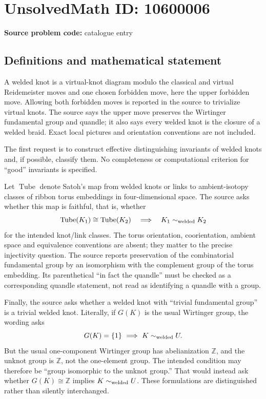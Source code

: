 \documentclass[11pt]{article}
\newcommand{\Z}{\mathbb{Z}}
\begin{document}
\section*{UnsolvedMath ID: 10600006}
\textbf{Source problem code:} catalogue entry
\subsection{Definitions and mathematical statement}
A welded knot is a virtual-knot diagram modulo the classical and virtual Reidemeister moves and one chosen forbidden move, here the upper forbidden move. Allowing both forbidden moves is reported in the source to trivialize virtual knots. The source says the upper move preserves the Wirtinger fundamental group and quandle; it also says every welded knot is the closure of a welded braid. Exact local pictures and orientation conventions are not included.

The first request is to construct effective distinguishing invariants of welded knots and, if possible, classify them. No completeness or computational criterion for ``good'' invariants is specified.

Let \(\operatorname{Tube}\) denote Satoh's map from welded knots or links to ambient-isotopy classes of ribbon torus embeddings in four-dimensional space. The source asks whether this map is faithful, that is, whether
\[
 \operatorname{Tube}(K_1)\cong\operatorname{Tube}(K_2)
 \quad\Longrightarrow\quad K_1\sim_{\rm welded}K_2
\]
for the intended knot/link classes. The torus orientation, coorientation, ambient space and equivalence conventions are absent; they matter to the precise injectivity question. The source reports preservation of the combinatorial fundamental group by an isomorphism with the complement group of the torus embedding. Its parenthetical ``in fact the quandle'' must be checked as a corresponding quandle statement, not read as identifying a quandle with a group.

Finally, the source asks whether a welded knot with ``trivial fundamental group'' is a trivial welded knot. Literally, if \(G(K)\) is the usual Wirtinger group, the wording asks
\[
 G(K)=\{1\}\ \Longrightarrow\ K\sim_{\rm welded}U.
\]
But the usual one-component Wirtinger group has abelianization \(\Z\), and the unknot group is \(\Z\), not the one-element group. The intended condition may therefore be ``group isomorphic to the unknot group.'' That would instead ask whether \(G(K)\cong\Z\) implies \(K\sim_{\rm welded}U\). These formulations are distinguished rather than silently interchanged.
\end{document}
